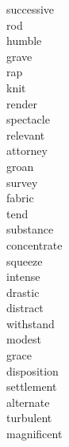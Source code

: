 \documentclass[b5paper, 11pt]{ctexart}
\begin{document}
\begin{multicols*}{3}
\begin{description}
\item[successive]

\item[rod]

\item[humble]

\item[grave]

\item[rap]

\item[knit]

\item[render]

\item[spectacle]

\item[relevant]

\item[attorney]

\item[groan]

\item[survey]

\item[fabric]

\item[tend]

\item[substance]

\item[concentrate]

\item[squeeze]

\item[intense]

\item[drastic]

\item[distract]

\item[withstand]

\item[modest]

\item[grace]

\item[disposition]

\item[settlement]

\item[alternate]

\item[turbulent]

\item[magnificent]


\end{description}
\end{multicols*}
\end{document}
